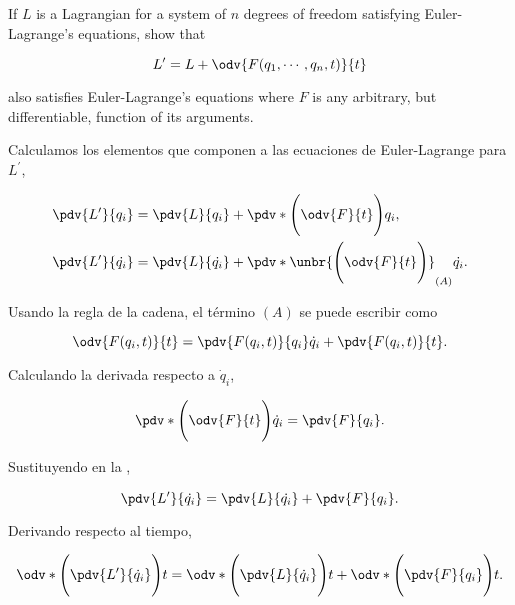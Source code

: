 \documentclass[../main.tex]{subfiles}
\begin{document}
\begin{problema}
	If \(L\) is a Lagrangian for a system of \(n\) degrees of freedom satisfying
	Euler-Lagrange's equations, show that

	\begin{equation*}
		L^{\prime} = L + \odv{F(q_{1}, \cdots, q_{n}, t)}{t}
	\end{equation*}

	also satisfies Euler-Lagrange's equations where \(F\) is any arbitrary,
	but differentiable, function of its arguments.

	\startsolution

	Calculamos los elementos que componen a las ecuaciones de
	Euler-Lagrange para \(L^{\prime}\),

	\begin{align}
		\pdv{L^{\prime}}{q_{i}}       & = \pdv{L}{q_{i}} + \pdv*{\Biggl(\odv{F}{t}\Biggr)}{q_{i}}\label{eq:second-term-L},                         \\
		\pdv{L^{\prime}}{\dot{q_{i}}} & = \pdv{L}{\dot{q_{i}}} + \pdv*{\unbr{\Biggl(\odv{F}{t}\Biggr)}_{(A)}}{\dot{q_{i}}}.\label{eq:first-term-L}
	\end{align}

	Usando la regla de la cadena, el término \((A)\) se puede escribir como

	\begin{equation*}
		\odv{F(q_{i}, t)}{t} = \pdv{F(q_{i}, t)}{q_{i}}\dot{q}_{i} + \pdv{F(q_{i}, t)}{t}.
	\end{equation*}

	Calculando la derivada respecto a \(\dot{q}_{i}\),

	\begin{equation*}
		\pdv*{\Biggl(\odv{F}{t}\Biggr)}{\dot{q}_{i}} = \pdv{F}{q_{i}}.
	\end{equation*}

	Sustituyendo en la ,

	\begin{equation*}
		\pdv{L^{\prime}}{\dot{q_{i}}}  = \pdv{L}{\dot{q_{i}}} + \pdv{F}{q_{i}}.
	\end{equation*}

	Derivando respecto al tiempo,

	\begin{equation*}
		\odv*{\Biggl(\pdv{L^{\prime}}{\dot{q}_{i}}\Biggr)}{t} = \odv*{\Biggl(\pdv{L}{\dot{q}_{i}}\Biggr)}{t} + \odv*{\Biggl(\pdv{F}{q_{i}}\Biggr)}{t}.
	\end{equation*}


\end{problema}
\end{document}
